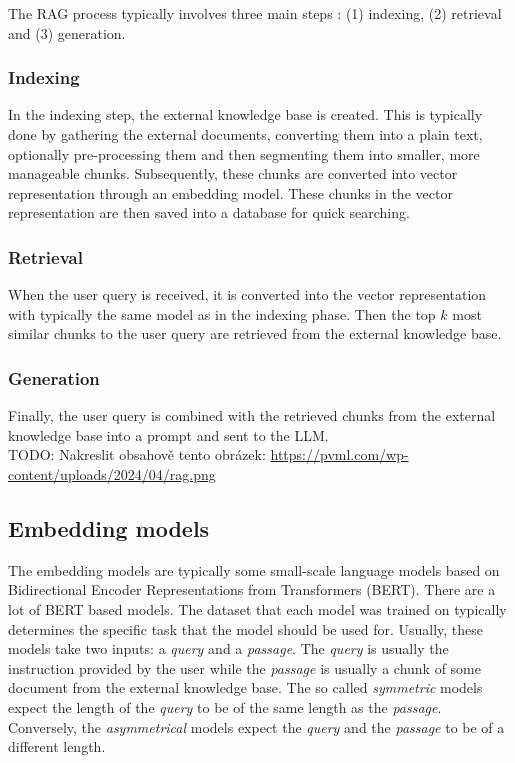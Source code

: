The RAG process typically involves three main steps \cite{Gao2023}: (1) indexing, (2) retrieval and (3) generation.

\subsubsection{Indexing}

In the indexing step, the external knowledge base is created. This is typically done by gathering the external documents, converting them into a plain text, optionally pre-processing them and then segmenting them into smaller, more manageable chunks. Subsequently, these chunks are converted into vector representation through an embedding model. These chunks in the vector representation are then saved into a database for quick searching.


\subsubsection{Retrieval}

When the user query is received, it is converted into the vector representation with typically the same model as in the indexing phase. Then the top $k$ most similar chunks to the user query are retrieved from the external knowledge base.


\subsubsection{Generation}

Finally, the user query is combined with the retrieved chunks from the external knowledge base into a prompt and sent to the LLM. \\

TODO: Nakreslit obsahově tento obrázek: \url{https://pvml.com/wp-content/uploads/2024/04/rag.png}


\subsection{Embedding models}

The embedding models are typically some small-scale language models based on Bidirectional Encoder Representations from Transformers (BERT). There are a lot of BERT based models. The dataset that each model was trained on typically determines the specific task that the model should be used for. Usually, these models take two inputs: a \textit{query} and a \textit{passage}. The \textit{query} is usually the instruction provided by the user while the \textit{passage} is usually a chunk of some document from the external knowledge base. The so called \textit{symmetric} models expect the length of the \textit{query} to be of the same length as the \textit{passage}. Conversely, the \textit{asymmetrical} models expect the \textit{query} and the \textit{passage} to be of a different length.



